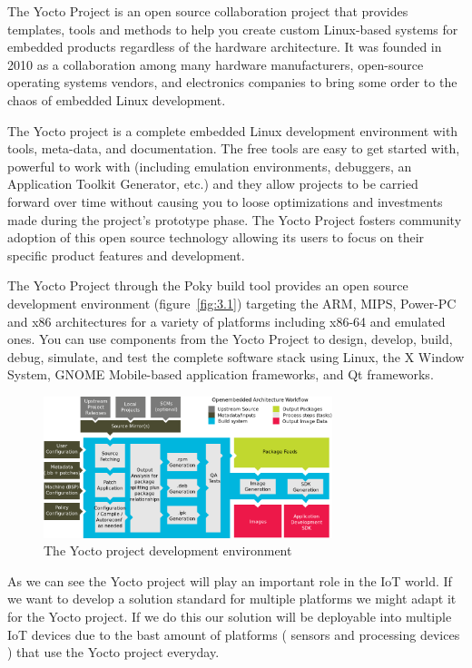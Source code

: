 The Yocto Project is an open source collaboration project that provides
templates, tools and methods to help you create custom Linux-based systems for
embedded products regardless of the hardware architecture\cite{yocto-project}.
It was founded in 2010 as a collaboration among many hardware manufacturers,
open-source operating systems vendors, and electronics companies to bring some
order to the chaos of embedded Linux development.\cite{Leppakoski}

The Yocto project  is a  complete embedded Linux development environment with
tools, meta-data, and documentation. The free tools are easy to get started
with, powerful to work with (including emulation environments, debuggers, an
Application Toolkit Generator, etc.) and they allow projects to be carried
forward over time without causing you to loose optimizations and investments
made during the project's prototype phase. The Yocto Project fosters community
adoption of this open source technology allowing its users to focus on their
specific product features and development.

The Yocto Project through the Poky build tool provides an open source
development environment (figure~\ref{fig:3.1})  targeting the ARM, MIPS,
Power-PC and x86 architectures for a variety of platforms including x86-64 and
emulated ones.  You can use components from the Yocto Project to design,
develop, build, debug, simulate, and test the complete software stack using
Linux, the X Window System, GNOME Mobile-based application frameworks, and Qt
frameworks. 

\begin{figure}[H]
\centering
\includegraphics[width=0.75\textwidth]{images/yocto-environment.png}
\caption{The Yocto project development environment}
\label{fig:3.2}
\end{figure}

As we can see the Yocto project will play an important role in the IoT world.
If we want to develop a solution standard for multiple platforms we might adapt
it for the Yocto project. If we do this our solution will be deployable into
multiple IoT devices due to the bast amount of platforms ( sensors and
processing devices ) that use the Yocto project everyday.

